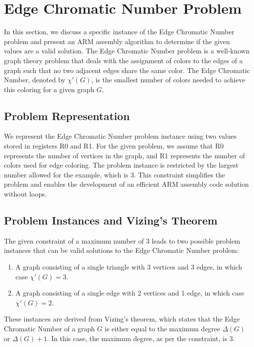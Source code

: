 \section{Edge Chromatic Number Problem}

In this section, we discuss a specific instance of the Edge Chromatic Number problem and present an ARM assembly algorithm to determine if the given values are a valid solution. The Edge Chromatic Number problem is a well-known graph theory problem that deals with the assignment of colors to the edges of a graph such that no two adjacent edges share the same color. The Edge Chromatic Number, denoted by $\chi'(G)$, is the smallest number of colors needed to achieve this coloring for a given graph $G$.

\subsection{Problem Representation}

We represent the Edge Chromatic Number problem instance using two values stored in registers R0 and R1. For the given problem, we assume that R0 represents the number of vertices in the graph, and R1 represents the number of colors used for edge coloring. The problem instance is restricted by the largest number allowed for the example, which is 3. This constraint simplifies the problem and enables the development of an efficient ARM assembly code solution without loops.

\subsection{Problem Instances and Vizing's Theorem}

The given constraint of a maximum number of 3 leads to two possible problem instances that can be valid solutions to the Edge Chromatic Number problem:

\begin{enumerate}
    \item A graph consisting of a single triangle with 3 vertices and 3 edges, in which case $\chi'(G) = 3$.
    \item A graph consisting of a single edge with 2 vertices and 1 edge, in which case $\chi'(G) = 2$.
\end{enumerate}

These instances are derived from Vizing's theorem, which states that the Edge Chromatic Number of a graph $G$ is either equal to the maximum degree $\Delta(G)$ or $\Delta(G) + 1$. In this case, the maximum degree, as per the constraint, is 3.

